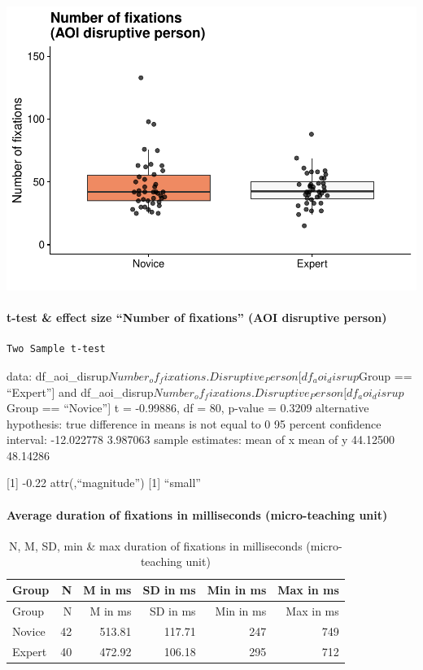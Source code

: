 \documentclass[
]{article}
\begin{document}
\includegraphics{expertise_2024_09_26_no_outlierdetection_MK_files/figure-latex/nof_disrup-1.pdf}

\paragraph{t-test \& effect size ``Number of fixations'' (AOI disruptive
person)}\label{t-test-effect-size-number-of-fixations-aoi-disruptive-person}

\begin{verbatim}
Two Sample t-test
\end{verbatim}

data:
df\_aoi\_disrup\(Number_of_fixations.Disruptive_Person[df_aoi_disrup\)Group
== ``Expert''{]} and
df\_aoi\_disrup\(Number_of_fixations.Disruptive_Person[df_aoi_disrup\)Group
== ``Novice''{]} t = -0.99886, df = 80, p-value = 0.3209 alternative
hypothesis: true difference in means is not equal to 0 95 percent
confidence interval: -12.022778 3.987063 sample estimates: mean of x
mean of y 44.12500 48.14286

{[}1{]} -0.22 attr(,``magnitude'') {[}1{]} ``small''

\paragraph{Average duration of fixations in milliseconds (micro-teaching
unit)}\label{average-duration-of-fixations-in-milliseconds-micro-teaching-unit}

\begin{longtable}[]{@{}lrrrrr@{}}
\caption{N, M, SD, min \& max duration of fixations in milliseconds
(micro-teaching unit)}\tabularnewline
\toprule\noalign{}
Group & N & M in ms & SD in ms & Min in ms & Max in ms \\
\midrule\noalign{}
\endfirsthead
\toprule\noalign{}
Group & N & M in ms & SD in ms & Min in ms & Max in ms \\
\midrule\noalign{}
\endhead
\bottomrule\noalign{}
\endlastfoot
Novice & 42 & 513.81 & 117.71 & 247 & 749 \\
Expert & 40 & 472.92 & 106.18 & 295 & 712 \\
\end{longtable}
\end{document}
